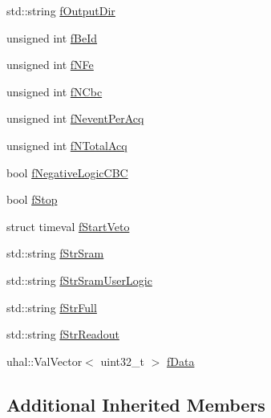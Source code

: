\begin{DoxyCompactItemize}
\item 
std\-::string \hyperlink{class_ph2___hw_interface_1_1_g_l_i_b_interface_ab2a20c062f740ad038774fcc256c21dd}{f\-Output\-Dir}
\item 
unsigned int \hyperlink{class_ph2___hw_interface_1_1_g_l_i_b_interface_af396916c943f603900f8a45cd7a68ed5}{f\-Be\-Id}
\item 
unsigned int \hyperlink{class_ph2___hw_interface_1_1_g_l_i_b_interface_a3d469fb13ac43aa30b1686991c8fe540}{f\-N\-Fe}
\item 
unsigned int \hyperlink{class_ph2___hw_interface_1_1_g_l_i_b_interface_ad1c4e330ec1cf3ec1332910ca213b161}{f\-N\-Cbc}
\item 
unsigned int \hyperlink{class_ph2___hw_interface_1_1_g_l_i_b_interface_a8e0542cf2ce82a75e9557ab4c4e169fe}{f\-Nevent\-Per\-Acq}
\item 
unsigned int \hyperlink{class_ph2___hw_interface_1_1_g_l_i_b_interface_a11473f0b2c8bed89613efc1e74ef19de}{f\-N\-Total\-Acq}
\item 
bool \hyperlink{class_ph2___hw_interface_1_1_g_l_i_b_interface_ad43b8e38647502f261b104aac88c2d0a}{f\-Negative\-Logic\-C\-B\-C}
\item 
bool \hyperlink{class_ph2___hw_interface_1_1_g_l_i_b_interface_a6662cd3720cc0e08d580d0e220118bf6}{f\-Stop}
\item 
struct timeval \hyperlink{class_ph2___hw_interface_1_1_g_l_i_b_interface_a2db744689fe0bdd195f00f6da2b955c0}{f\-Start\-Veto}
\item 
std\-::string \hyperlink{class_ph2___hw_interface_1_1_g_l_i_b_interface_ac9b1a3d2dd2e8fc4e12f13ed8f985699}{f\-Str\-Sram}
\item 
std\-::string \hyperlink{class_ph2___hw_interface_1_1_g_l_i_b_interface_ae8df09ba9b0b3e6ef079d9881f31f2c0}{f\-Str\-Sram\-User\-Logic}
\item 
std\-::string \hyperlink{class_ph2___hw_interface_1_1_g_l_i_b_interface_ab60702b93deaba12173e0d7730a2282f}{f\-Str\-Full}
\item 
std\-::string \hyperlink{class_ph2___hw_interface_1_1_g_l_i_b_interface_aee576c460d51091113984549858c7e23}{f\-Str\-Readout}
\item 
uhal\-::\-Val\-Vector$<$ uint32\-\_\-t $>$ \hyperlink{class_ph2___hw_interface_1_1_g_l_i_b_interface_a808c1b58fb989f76d5b172b177049af2}{f\-Data}
\end{DoxyCompactItemize}
\subsection*{Additional Inherited Members}


